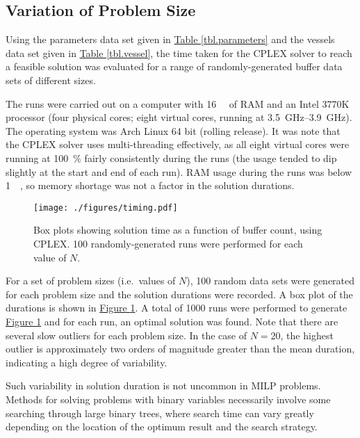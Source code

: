 \subsection{Variation of Problem Size}\label{SS.buffcount}
Using the parameters data set given in 
\hyperref[tbl.parameters]{Table \ref*{tbl.parameters}} and the vessels data set
given in \hyperref[tbl.vessel]{Table \ref*{tbl.vessel}}, the time taken for
the CPLEX solver to reach a feasible solution was evaluated for a range of 
randomly-generated buffer data sets of different sizes.

The runs were carried out on a computer with \SI{16}{\giga\byte} of RAM and an
Intel 3770K processor (four physical cores; eight virtual cores, running at
\SIrange{3.5}{3.9}{\GHz}).
The operating system was Arch Linux 64 bit (rolling release).
It was note that the CPLEX solver uses multi-threading effectively, as all
eight virtual cores were running at \SI{100}{\%} fairly consistently during the
runs (the usage tended to dip slightly at the start and end of each run).
RAM usage during the runs was below \SI{1}{\giga\byte}, so memory shortage was
not a factor in the solution durations.

\begin{figure}
    \label{fig.timing}
    \centering
    \texttt{[image: ./figures/timing.pdf]}
    \caption[Solution time as a function of buffer count using CPLEX]{Box plots
        showing solution time as a function of buffer count, using CPLEX.
        100 randomly-generated runs were performed for each value of $N$.}
\end{figure}

For a set of problem sizes (i.e.\ values of $N$), 100 random data sets
were generated for each problem size and the solution durations were recorded.
A box plot of the durations is shown in 
\hyperref[fig.timing]{Figure \ref*{fig.timing}}.
A total of \num{1000} runs were performed to generate
\hyperref[fig.timing]{Figure \ref*{fig.timing}} and for each run, an optimal
solution was found.
Note that there are several slow outliers for each problem size.
In the case of $N=20$, the highest outlier is approximately two
orders of magnitude greater than the mean duration, indicating a high degree
of variability.

Such variability in solution duration is not uncommon in MILP problems.
Methods for solving problems with binary variables necessarily involve some
searching through large binary trees, where search time can vary greatly
depending on the location of the optimum result and the search strategy.

